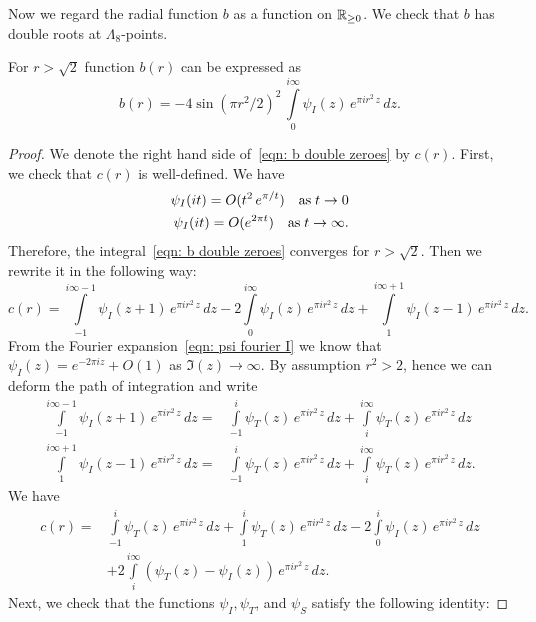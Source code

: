 Now we regard the radial function    $b$ as a function on $\mathbb{R}_{\geq0}$. We check that $b$ has double roots at $\Lambda_8$-points.
\begin{proposition}\label{prop: b(r) double zeroes}
For $r>\sqrt{2}$ function $b(r)$ can be expressed as
\begin{equation}\label{eqn: b double zeroes}
    b(r)=-4\sin(\pi r^2/2)^2\,\int\limits_{0}^{i\infty}\psi_I(z)\,e^{\pi i r^2 \,z}\,dz.
\end{equation}
\end{proposition}
\begin{proof}
We denote the right hand side of~\eqref{eqn: b double zeroes} by $c(r)$. First, we check that $c(r)$ is well-defined. We have
\begin{align}
\psi_I(it)=O(t^{2}\,e^{\pi/t})\quad\mbox{as}\;t\to 0\notag\\
    \psi_I(it)=O(e^{2\pi t})\quad\mbox{as}\;t\to\infty.\notag
\end{align}
Therefore, the integral~\eqref{eqn: b double zeroes} converges for $r>\sqrt{2}$.
Then we rewrite it in the following way:
$$c(r)=\int\limits_{-1}^{i\infty-1}\psi_I(z+1)\,e^{\pi i r^2 \,z}\,dz-2\int\limits_{0}^{i\infty}\psi_I(z)\,e^{\pi i r^2 \,z}\,dz+
\int\limits_{1}^{i\infty+1}\psi_I(z-1)\,e^{\pi i r^2 \,z}\,dz.$$
From the Fourier expansion~\eqref{eqn: psi fourier I} we know that $\psi_I(z)=e^{-2\pi i z}+O(1)$ as $\Im(z)\to\infty$.
By assumption $r^2>2$, hence we can deform the path of integration and write
\begin{align}\label{eqn: inside proof 1}
\int\limits_{-1}^{i\infty-1}\psi_I(z+1)\,e^{\pi i r^2 \,z}\,dz=&
\int\limits_{-1}^{i}\psi_T(z)\,e^{\pi i r^2 \,z}\,dz+\int\limits_{i}^{i\infty}\psi_T(z)\,e^{\pi i r^2 \,z}\,dz\\
\int\limits_{1}^{i\infty+1}\psi_I(z-1)\,e^{\pi i r^2 \,z}\,dz=&
\int\limits_{-1}^{i}\psi_T(z)\,e^{\pi i r^2 \,z}\,dz+\int\limits_{i}^{i\infty}\psi_T(z)\,e^{\pi i r^2 \,z}\,dz.
\end{align}
We have
\begin{align}\label{eqn: c1}c(r)=&\int\limits_{-1}^{i}\psi_T(z)\,e^{\pi i r^2 \,z}\,dz+\int\limits_{1}^{i}\psi_T(z)\,e^{\pi i r^2 \,z}\,dz
-2\int\limits_{0}^{i}\psi_I(z)\,e^{\pi i r^2 \,z}\,dz\\
&+2\int\limits_{i}^{i\infty}(\psi_T(z)-\psi_I(z))\,e^{\pi i r^2 \,z}\,dz.\nonumber
    \end{align}
Next, we check that the functions $\psi_I,\psi_T$, and $\psi_S$ satisfy the following identity:

\end{proof}
